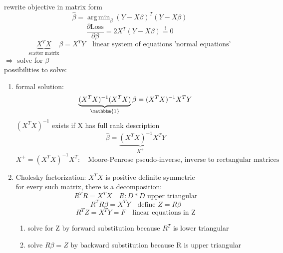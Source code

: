 \documentclass[11pt]{article}
\DeclareMathOperator*{\argmin}{arg\,min}
\begin{document}
      rewrite objective in matrix form
      \begin{equation*}
        \hat{\beta} = \argmin_{\beta}(Y-X\beta)^T(Y-X\beta)
      \end{equation*}
      \begin{equation*}
        \frac{\partial \text{Loss}}{\partial \beta} = 2X^T(Y-X\beta) \overset{!}{=}0
      \end{equation*}
      \begin{equation*}
        \underbrace{X^TX}_{\text{scatter matrix}}\beta = X^TY \quad \text{linear system of equations 'normal equations'}
      \end{equation*}
      $\Rightarrow$ solve for $\beta$ \\
      possibilities to solve:
      \begin{enumerate}
        \item formal solution:
        \begin{equation*}
          \underbrace{(X^TX)^{-1}(X^TX)}_{\mathbbm{1}}\beta = (X^TX)^{-1}X^TY
        \end{equation*}
        $(X^TX)^{-1}$ exists if X has full rank description
        \begin{equation*}
          \hat{\beta}= \underbrace{(X^TX)^{-1}X^T}_{X^+}Y
        \end{equation*}
        \begin{equation*}
          X^+ = (X^TX)^{-1}X^T: \quad \text{Moore-Penrose pseudo-inverse, inverse to rectangular matrices}
        \end{equation*}
        \item Cholesky factorization: $X^TX$ is positive definite symmetric \\
        for every such matrix, there is a decomposition:
        \begin{equation*}
          R^TR=X^TX \quad R:D*D \text{ upper triangular}
        \end{equation*}
        \begin{equation*}
          R^TR\beta = X^TY \quad \text{define } Z=R\beta
        \end{equation*}
        \begin{equation*}
          R^TZ=X^TY=F\quad \text{linear equations in Z}
        \end{equation*}
        \begin{enumerate}
          \item solve for Z by forward substitution because $R^T$ is lower triangular
          \item solve $R\beta=Z$ by backward substitution because R is upper triangular

\end{enumerate}
\end{enumerate}
\end{document}
